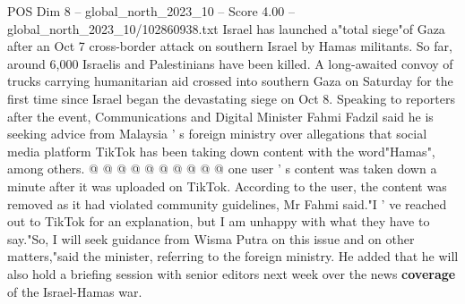 \begin{textsample}{POS Dim 8 – global\_north\_2023\_10 – Score 4.00 – global\_north\_2023\_10/102860938.txt}
Israel has launched a"total siege"of Gaza after an Oct 7 cross-border attack on southern Israel by Hamas militants.
So far, around 6,000 Israelis and Palestinians have been killed.
A long-awaited convoy of trucks carrying humanitarian aid crossed into southern Gaza on Saturday for the first time since Israel began the devastating siege on Oct 8.
Speaking to reporters after the event, Communications and Digital Minister Fahmi Fadzil said he is seeking advice from Malaysia ' s foreign ministry over allegations that social media platform TikTok has been taking down content with the word"Hamas", among others. @ @ @ @ @ @ @ @ @ @ one user ' s content was taken down a minute after it was uploaded on TikTok.
According to the user, the content was removed as it had violated community guidelines, Mr Fahmi said."I ' ve reached out to TikTok for an explanation, but I am unhappy with what they have to say."So, I will seek guidance from Wisma Putra on this issue and on other matters,"said the minister, referring to the foreign ministry.
He added that he will also hold a briefing session with senior editors next week over the news \textbf{coverage} of the Israel-Hamas war.

\end{textsample}
